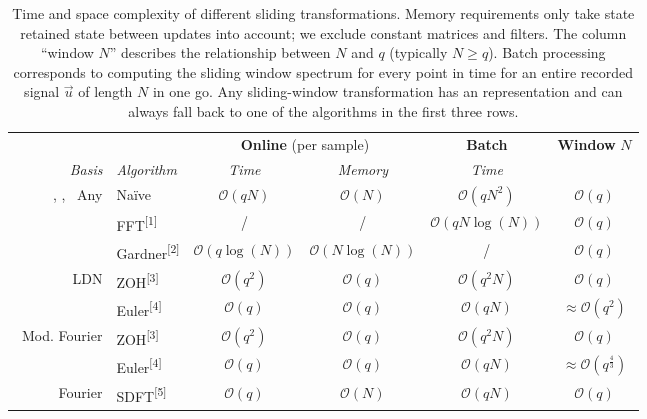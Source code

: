 \begin{table}[p]
	\caption[Time and space complexity of different sliding transformations]{Time and space complexity of different sliding transformations.
	Memory requirements only take state retained state between updates into account; we exclude constant matrices and filters.
	The column \enquote{window $N$} describes the relationship between $N$ and $q$ (typically $N \geq q$).
	Batch processing corresponds to computing the sliding window spectrum for every point in time for an entire recorded signal $\vec u$ of length $N$ in one go.
	Any sliding-window transformation has an \FIR representation and can always fall back to one of the algorithms in the first three rows.
	}
	\label{tbl:time_comparison}
	\small\sffamily
	{
	\centering
	\setlength{\tabcolsep}{8.75pt}
	\begin{tabular}{r l c c c c}
		\toprule
		& & \multicolumn{2}{c}{\textbf{Online} (per sample)} & \multicolumn{1}{c}{\textbf{Batch}} & \textbf{Window} $N$ \\
		\cmidrule(r){3-4}\cmidrule(r){5-5}\cmidrule{6-6}
		\emph{Basis} & \emph{Algorithm} & \emph{Time} & \emph{Memory} & \emph{Time} & \\
		\midrule
		\symLTI, \symSDT, \symFIR~Any & Na\"ive & $\mathcal{O}(qN)$ & $\mathcal{O}(N)$ & $\mathcal{O}(qN^2)$ & $\mathcal{O}(q)$ \\
		\cmidrule{2-6}
		    & FFT\textsuperscript{[1]} & / & / & $\mathcal{O}(qN \log(N))$ & $\mathcal{O}(q)$  \\
		\cmidrule{2-6}
		    & Gardner\textsuperscript{[2]} & $\mathcal{O}(q \log(N))$ & $\mathcal{O}(N \log(N))$ & / & $\mathcal{O}(q)$ \\
		\midrule
		\symLTI~LDN &
			ZOH\textsuperscript{[3]} & $\mathcal{O}(q^2)$ & $\mathcal{O}(q)$ & $\mathcal{O}(q^2 N)$ & $\mathcal{O}(q)$ \\
		\cmidrule{2-6}
		& Euler\textsuperscript{[4]} & $\mathcal{O}(q)$ & $\mathcal{O}(q)$ & $\mathcal{O}(qN)$ & $\approx \mathcal{O}(q^2)$ \\
		\midrule
		\symLTI~Mod. Fourier &
			ZOH\textsuperscript{[3]} & $\mathcal{O}(q^2)$ & $\mathcal{O}(q)$ & $\mathcal{O}(q^2N)$ & $\mathcal{O}(q)$ \\
		\cmidrule{2-6}
		& Euler\textsuperscript{[4]} & $\mathcal{O}(q)$ & $\mathcal{O}(q)$ & $\mathcal{O}(qN)$ & $\approx \mathcal{O}(q^{\frac{4}3})$ \\
		\midrule
		\symSDT~Fourier & SDFT\textsuperscript{[5]} & $\mathcal{O}(q)$ & $\mathcal{O}(N)$ & $\mathcal{O}(qN)$ & $\mathcal{O}(q)$ \\

\end{tabular}}
\end{table}
